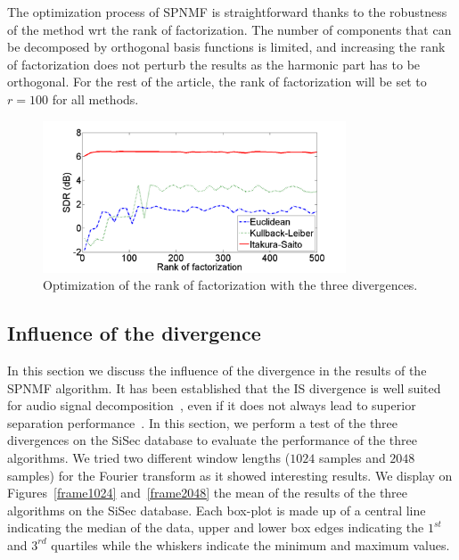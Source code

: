 The optimization process of SPNMF is straightforward thanks to the robustness of the method wrt the rank of factorization. The number of components that can be decomposed by orthogonal basis functions is limited, and increasing the rank of factorization does not perturb the results as the harmonic part has to be orthogonal. For the rest of the article, the rank of factorization will be set to $r=100$ for all methods.



\begin{figure}[htb]

  \centering 
  \includegraphics[width=9cm]{fig/RankOfFact}
  \caption{\label{RankOfFact} Optimization of the rank of factorization with the three divergences.}
  
\end{figure}




\subsection{Influence of the divergence}
\label{setup:divergence}

In this section we discuss the influence of the divergence in the results of the SPNMF algorithm. It has been established that the IS divergence is well suited for audio signal decomposition~\cite{gray1980distortion}, even if it does not always lead to superior separation performance~\cite{canadas2014percussive}. In this section, we perform a test of the three divergences on the SiSec database to evaluate the performance of the three algorithms. We tried two different window lengths ($1024$ samples and $2048$ samples) for the Fourier transform as it showed interesting results. We display on Figures~\ref{frame1024} and~\ref{frame2048} the mean of the results of the three algorithms on the SiSec database. Each box-plot is made up of a central line indicating the median of the data, upper and lower box edges indicating the $1^{st}$ and $3^{rd}$ quartiles while the whiskers indicate the minimum and maximum values. 

